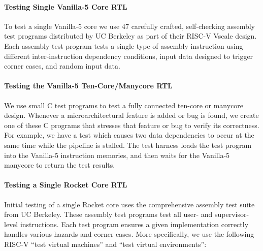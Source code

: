 \paragraph{Testing Single Vanilla-5 Core RTL}
To test a single Vanilla-5 core we use 47 carefully crafted,
self-checking assembly test programs distributed by UC Berkeley as part
of their RISC-V Vscale design. Each assembly test program tests a single
type of assembly instruction using different inter-instruction dependency
conditions, input data designed to trigger corner cases, and random input
data.

\paragraph{Testing the Vanilla-5 Ten-Core/Manycore RTL}
We use small C test programs to test a fully connected ten-core or
manycore design. Whenever a microarchitectural feature is added or bug is
found, we create one of these C programs that stresses that feature or
bug to verify its correctness. For example, we have a test which causes
two data dependencies to occur at the same time while the pipeline is
stalled. The test harness loads the test program into the Vanilla-5
instruction memories, and then waits for the Vanilla-5 manycore to return
the test results.

\paragraph{Testing a Single Rocket Core RTL}
Initial testing of a single Rocket core uses the comprehensive assembly
test suite from UC Berkeley. These assembly test programs test all user-
and supervisor-level instructions. Each test program ensures a given
implementation correctly handles various hazards and corner cases. More
specifically, we use the following RISC-V ``test virtual machines'' and
``test virtual environments'':

